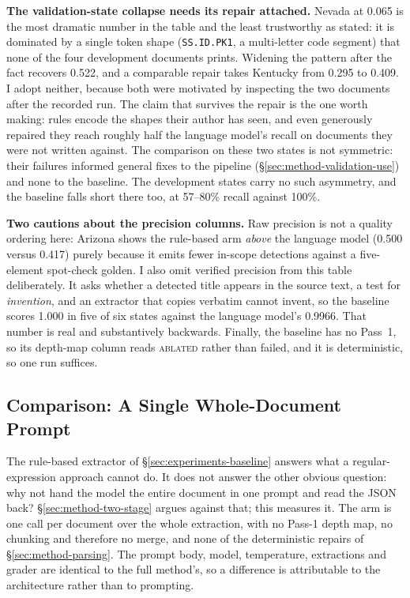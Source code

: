 \textbf{The validation-state collapse needs its repair attached.} Nevada at 0.065 is the
most dramatic number in the table and the least trustworthy as stated: it is
dominated by a single token shape (\texttt{SS.ID.PK1}, a multi-letter code
segment) that none of the four development documents prints. Widening the
pattern after the fact recovers 0.522, and a comparable repair takes Kentucky
from 0.295 to 0.409. I adopt neither, because both were motivated by inspecting
the two documents after the recorded run. The claim that survives the repair is
the one worth making: rules encode the shapes their author has seen, and even
generously repaired they reach roughly half the language model's recall on
documents they were not written against. The comparison on these two states is
not symmetric: their failures informed general fixes to the pipeline
(\S\ref{sec:method-validation-use}) and none to the baseline. The development
states carry no such asymmetry, and the baseline falls short there too, at
57--80\% recall against 100\%.

\textbf{Two cautions about the precision columns.} Raw precision is not a
quality ordering here: Arizona shows the rule-based arm \emph{above} the
language model (0.500 versus 0.417) purely because it emits fewer in-scope
detections against a five-element spot-check golden. I also omit verified
precision from this table deliberately. It asks whether a detected title
appears in the source text, a test for \emph{invention}, and an extractor that
copies verbatim cannot invent, so the baseline scores 1.000 in five of six
states against the language model's 0.9966. That number is real and
substantively backwards. Finally, the baseline has no Pass~1, so its depth-map
column reads \textsc{ablated} rather than failed, and it is deterministic, so
one run suffices.

\subsection{Comparison: A Single Whole-Document Prompt}
\label{sec:experiments-wholedoc}

The rule-based extractor of \S\ref{sec:experiments-baseline} answers what a
regular-expression approach cannot do. It does not answer the other obvious
question: why not hand the model the entire document in one prompt and read the
JSON back? \S\ref{sec:method-two-stage} argues against that; this measures it.
The arm is one call per document over the whole extraction, with no Pass-1 depth
map, no chunking and therefore no merge, and none of the deterministic repairs
of \S\ref{sec:method-parsing}. The prompt body, model, temperature, extractions
and grader are identical to the full method's, so a difference is attributable
to the architecture rather than to prompting.

